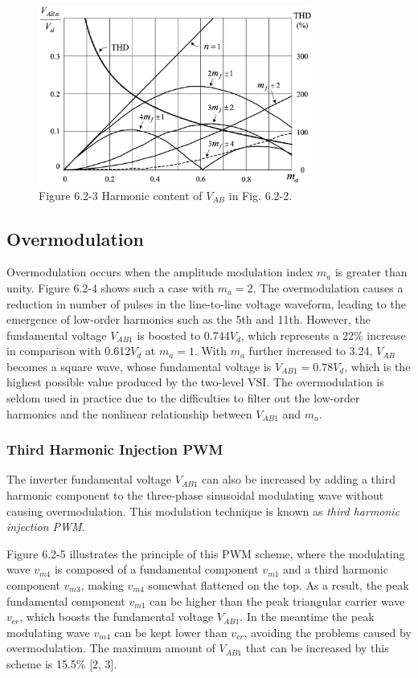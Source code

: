 \documentclass[letterpaper,12pt]{article}
\begin{document}
\begin{figure}[h]
	\centering
	\includegraphics[width=0.8\textwidth]{graficos/img80.jpg}
	\caption{Figure 6.2-3 Harmonic content of $V_{AB}$ in Fig. 6.2-2.}
\end{figure}
\FloatBarrier


\subsection{Overmodulation}
Overmodulation occurs when the amplitude modulation index $m_a$ is greater than unity. Figure 6.2-4 shows such a case with $m_a = 2$. The overmodulation causes a reduction in number of pulses in the line-to-line voltage waveform, leading to the emergence of low-order harmonics such as the 5th and 11th. However, the fundamental voltage $V_{AB1}$ is boosted to 0.744$V_d$, which represents a 22\% increase in comparison with 0.612$V_d$ at $m_a = 1$. With $m_a$ further increased to 3.24, $V_{AB}$ becomes a square wave, whose fundamental voltage is $V_{AB1} = 0.78V_d$, which is the highest possible value produced by the two-level VSI. The overmodulation is seldom used in practice due to the difficulties to filter out the low-order harmonics and the nonlinear relationship between $V_{AB1}$ and $m_a$.

\subsubsection{Third Harmonic Injection PWM}
The inverter fundamental voltage $V_{AB1}$ can also be increased by adding a third harmonic component to the three-phase sinusoidal modulating wave without causing overmodulation. This modulation technique is known as \textit{third harmonic injection PWM}.

Figure 6.2-5 illustrates the principle of this PWM scheme, where the modulating wave $v_{m4}$ is composed of a fundamental component $v_{m1}$ and a third harmonic component $v_{m3}$, making $v_{m4}$ somewhat flattened on the top. As a result, the peak fundamental component $v_{m1}$ can be higher than the peak triangular carrier wave $v_{cr}$, which boosts the fundamental voltage $V_{AB1}$. In the meantime the peak modulating wave $v_{m4}$ can be kept lower than $v_{cr}$, avoiding the problems caused by overmodulation. The maximum amount of $V_{AB1}$ that can be increased by this scheme is 15.5\% [2, 3].
\end{document}
